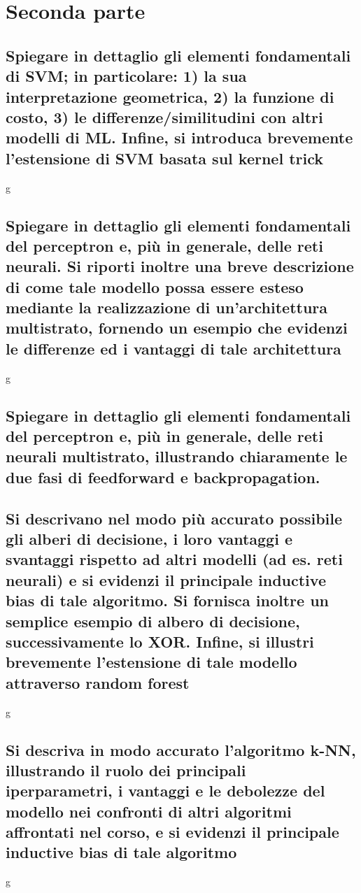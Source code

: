\documentclass[10pt,oneside,a4paper]{article}
\begin{document}
	
	
	\section{Seconda parte}
	\subsection{Spiegare in dettaglio gli elementi fondamentali di SVM; in particolare:
		1) la sua interpretazione geometrica, 2) la funzione di costo, 3) le differenze/similitudini con altri modelli di ML.
		Infine, si introduca brevemente l’estensione di SVM basata sul kernel trick}
	g
	
	\subsection{Spiegare in dettaglio gli elementi fondamentali del perceptron e, più in generale, delle reti
		neurali. Si riporti inoltre una breve descrizione di come tale modello possa essere esteso
		mediante la realizzazione di un’architettura multistrato, fornendo un esempio che evidenzi
		le differenze ed i vantaggi di tale architettura}
	g
	
	\subsection{Spiegare in dettaglio gli elementi fondamentali del perceptron e, più in generale, delle reti
		neurali multistrato, illustrando chiaramente le due fasi di feedforward e backpropagation.}
	
	
	
	\subsection{Si descrivano nel modo più accurato possibile gli alberi di decisione, i loro vantaggi e svantaggi rispetto ad altri modelli (ad es. reti neurali)
		 e si evidenzi il principale inductive bias di tale algoritmo. Si fornisca inoltre un semplice esempio di albero di decisione, successivamente lo XOR. Infine, si illustri brevemente l’estensione di tale modello attraverso random forest}
	g
	
	
	\subsection{Si descriva in modo accurato l’algoritmo k-NN, illustrando il ruolo dei principali iperparametri, i vantaggi e le debolezze del modello nei 
		confronti di altri algoritmi affrontati nel corso, e si evidenzi il principale inductive bias di tale algoritmo}
	g
	
	
	
\end{document}
